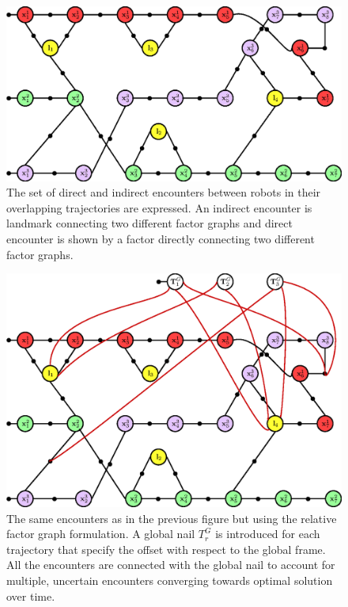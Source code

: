 \begin{figure}
\centering
\includegraphics[width=\textwidth]{Chapters/figures4/pose_graph_encounters}
\caption{The set of direct and indirect encounters between robots in their overlapping trajectories are expressed. An indirect encounter is landmark connecting two different factor graphs and direct encounter is shown by a factor directly connecting two different factor graphs.}
\label{fig:pose_graphs_encounter}
\end{figure}
\begin{figure}
\centering
\includegraphics[width=\textwidth]{Chapters/figures4/pose_graph_with_nail}
\caption{The same encounters as in the previous figure but using the relative factor graph formulation. A global nail $T_r^G$ is introduced for each trajectory that specify the offset with respect to the global frame. All the encounters are connected with the global nail to account for multiple, uncertain encounters converging towards optimal solution over time.}
\label{fig:pose_graphs_nails}
\end{figure}
 
